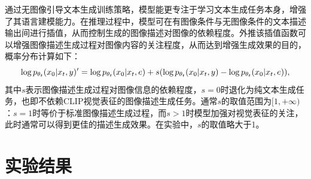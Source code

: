通过无图像引导文本生成训练策略，模型能更专注于学习文本生成任务本身，增强了其语言建模能力。在推理过程中，模型可在有图像条件与无图像条件的文本描述输出间进行插值，从而控制生成的图像描述对图像的依赖程度。外推该插值函数可以增强图像描述生成过程对图像内容的关注程度，从而达到增强生成效果的目的，概率分布计算如下：
\begin{equation}
    \log p_{\theta_t}({x}_{0} | {x}_{t}, {y})'=\log p_{\theta_t}({x}_{0} | {x}_{t}, {e}) + \\ s(\log p_{\theta_t}({x}_{0} | {x}_{t}, {y}) - \log p_{\theta_t}({x}_{0} | {x}_{t}, {e})),
\end{equation}
其中$s$表示图像描述生成过程对图像信息的依赖程度，$s=0$时退化为纯文本生成任务，也即不依赖CLIP视觉表征的图像描述生成任务。通常$s$的取值范围为$[1, +\infty)$：$s=1$时等价于标准图像描述生成过程，而$s>1$时模型加强对视觉表征的关注，此时通常可以得到更佳的描述生成效果。在实验中，$s$的取值略大于1。


\section{实验结果}
\label{sec:ddcap-result}
